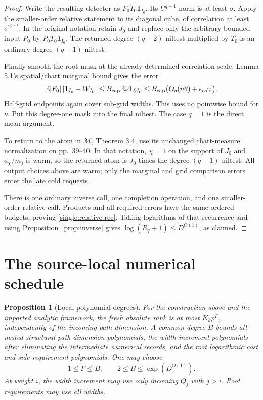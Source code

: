 \documentclass[11pt,a4paper]{article}
\newtheorem{proposition}[theorem]{Proposition}
\theoremstyle{definition}
\newcommand{\M}{\mathcal M}
\newcommand{\E}{\mathbb E}
\newcommand{\one}{\mathbf 1}
\begin{document}
\begin{proof}
Write the resulting detector as \(F_0T_0\one_{I_0}\).
Its \(U^{q-1}\)-norm is at least \(\sigma\). Apply the
smaller-order relative statement to its diagonal cube, of
correlation at least \(\sigma^{2^{q-1}}\). In the original
notation retain \(J_0\) and replace only the arbitrary bounded
input \(P_0\) by \(P_0T_0\one_{I_0}\). The returned
degree-\((q-2)\) niltest multiplied by \(T_0\) is an
ordinary degree-\((q-1)\) niltest.

Finally smooth the root mask at the already determined correlation
scale. Lemma 5.1's spatial/chart marginal bound gives the error
\[
 \E|F_0|\,|\one_{I_0}-W_{I_0}|
 \le B_{\rm cap}\E\nu\one_{\partial I_0}
 \le B_{\rm cap}\bigl(O_q(n\theta)+\epsilon_{\rm cold}\bigr).
\]
Half-grid endpoints again cover sub-grid widths. This uses no
pointwise bound for \(\nu\). Put this degree-one mask into
the final niltest. The case \(q=1\) is the direct mean argument.

To return to the atom in \(\M\), Theorem 3.4, use its unchanged
chart-measure normalization on pp.~39--40. In that notation,
\(\chi=1\) on the support of \(J_0\) and \(a_\chi/m_j\) is warm,
so the returned atom is \(J_0\) times the degree-\((q-1)\) niltest.
All output choices above are warm; only the marginal and grid
comparison errors enter the late cold requests.

There is one ordinary inverse call, one completion operation,
and one smaller-order relative call. Products and all required
errors have the same ordered budgets, proving
\eqref{single:relative-rec}. Taking logarithms of that recurrence
and using Proposition~\ref{prop:inverse} gives
\(\log(R_q+1)\le D^{O(1)}\), as claimed.
\end{proof}


\section{The source-local numerical schedule}\label{sec:library}

\begin{proposition}[Local polynomial degrees]\label{prop:local}
For the construction above and the imported analytic framework, the
fresh absolute rank is at most \(K_kp^F\), independently of the
incoming path dimension. A common degree \(B\) bounds all nested
structural path-dimension polynomials, the width-increment
polynomials after eliminating the intermediate numerical records,
and the root logarithmic cost and side-requirement polynomials.
One may choose
\begin{equation}\label{eq:FB}
 1\le F\le B,\qquad 2\le B\le\exp(D^{O(1)}).
\end{equation}
At weight \(i\), the width increment may use only incoming
\(Q_j\) with \(j>i\). Root requirements may use all widths.
\end{proposition}
\end{document}
